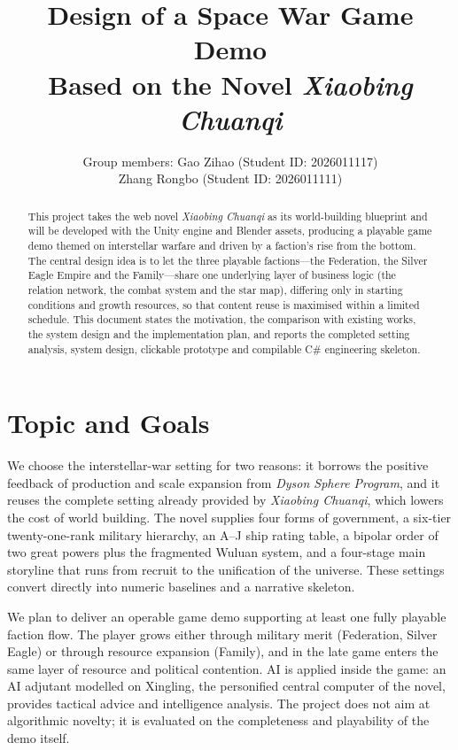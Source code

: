\documentclass[11pt,a4paper]{article}
\title{Design of a Space War Game Demo\\ Based on the Novel \textit{Xiaobing Chuanqi}}
\author{Group members: Gao Zihao (Student ID: 2026011117)\\[2pt]
        \phantom{Group members: }Zhang Rongbo (Student ID: 2026011111)}
\date{}
\begin{document}
\maketitle
\vspace*{-2.6ex}

\begin{abstract}
\noindent This project takes the web novel \textit{Xiaobing Chuanqi} as its world-building
blueprint and will be developed with the Unity engine and Blender assets, producing a playable
game demo themed on interstellar warfare and driven by a faction's rise from the bottom.
The central design idea is to let the three playable factions---the Federation, the Silver Eagle
Empire and the Family---share one underlying layer of business logic (the relation network, the
combat system and the star map), differing only in starting conditions and growth resources,
so that content reuse is maximised within a limited schedule. This document states the motivation,
the comparison with existing works, the system design and the implementation plan, and reports the
completed setting analysis, system design, clickable prototype and compilable C\# engineering skeleton.
\end{abstract}

\section{Topic and Goals}

We choose the interstellar-war setting for two reasons: it borrows the positive feedback of
production and scale expansion from \textit{Dyson Sphere Program}, and it reuses the complete
setting already provided by \textit{Xiaobing Chuanqi}, which lowers the cost of world building.
The novel supplies four forms of government, a six-tier twenty-one-rank military hierarchy,
an A--J ship rating table, a bipolar order of two great powers plus the fragmented Wuluan system,
and a four-stage main storyline that runs from recruit to the unification of the universe.
These settings convert directly into numeric baselines and a narrative skeleton.

We plan to deliver an operable game demo supporting at least one fully playable faction flow.
The player grows either through military merit (Federation, Silver Eagle) or through resource
expansion (Family), and in the late game enters the same layer of resource and political contention.
AI is applied inside the game: an AI adjutant modelled on Xingling, the personified central computer
of the novel, provides tactical advice and intelligence analysis. The project does not aim at
algorithmic novelty; it is evaluated on the completeness and playability of the demo itself.
\end{document}
